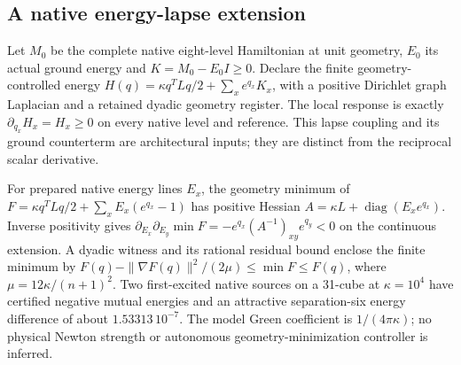\subsection{A native energy-lapse extension}
Let $M_0$ be the complete native eight-level Hamiltonian at unit geometry,
$E_0$ its actual ground energy and $K=M_0-E_0I\geq0$. Declare the finite
geometry-controlled energy
$H(q)=\kappa q^TLq/2+\sum_x e^{q_x}K_x$, with a positive Dirichlet graph
Laplacian and a retained dyadic geometry register. The local response is
exactly $\partial_{q_x}H_x=H_x\geq0$ on every native level and reference.
This lapse coupling and its ground counterterm are architectural inputs;
they are distinct from the reciprocal scalar derivative.

For prepared native energy lines $E_x$, the geometry minimum of
$F=\kappa q^TLq/2+\sum_x E_x(e^{q_x}-1)$ has positive Hessian
$A=\kappa L+\operatorname{diag}(E_xe^{q_x})$. Inverse positivity gives
$\partial_{E_x}\partial_{E_y}\min F=-e^{q_x}(A^{-1})_{xy}e^{q_y}<0$
on the continuous extension. A dyadic witness and its rational residual
bound enclose the finite minimum by
$F(q)-\|\nabla F(q)\|^2/(2\mu)\leq\min F\leq F(q)$,
where $\mu=12\kappa/(n+1)^2$. Two first-excited native sources on a
31-cube at $\kappa=10^4$ have certified negative mutual energies and
an attractive separation-six energy difference of about $1.53313\,10^{-7}$.
The model Green coefficient is $1/(4\pi\kappa)$; no physical Newton
strength or autonomous geometry-minimization controller is inferred.
